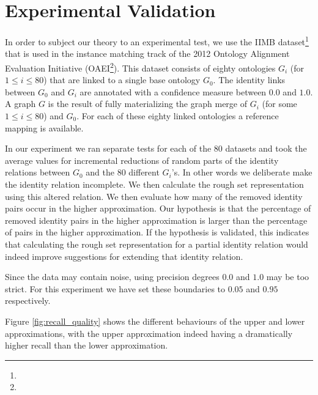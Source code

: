 \section{Experimental Validation}
\label{sec:experiment}
\label{sec:experimental_design}
\label{sec:experimental_validation}

In order to subject our theory to an experimental test,
  we use the IIMB dataset\footnote{}
  that is used in the
  instance matching track of the 2012 Ontology Alignment Evaluation
  Initiative (OAEI\footnote{}).
This dataset consists of eighty ontologies $G_i$ (for $1 \leq i \leq 80$)
  that are linked to a single base ontology $G_0$.
The identity links between $G_0$ and $G_i$ are annotated with a
  confidence measure between $0.0$ and $1.0$.
A graph $G$ is the result of fully materializing the graph merge
  of $G_i$ (for some $1 \leq i \leq 80$) and $G_0$.
For each of these eighty linked ontologies a reference mapping is available.

In our experiment we ran separate tests for each of the $80$ datasets
  and took the average values for incremental reductions of
  random parts of the identity relations between $G_0$ and the $80$
  different $G_i$'s.
In other words we deliberate make the identity relation incomplete.
We then calculate the rough set representation using this altered relation.
We then evaluate how many of the removed identity pairs occur in
  the higher approximation.
Our hypothesis is that the percentage of removed identity pairs
  in the higher approximation is larger than the percentage of pairs
  in the higher approximation.
If the hypothesis is validated, this indicates that
  calculating the rough set representation for a partial identity relation
  would indeed improve suggestions for extending that identity relation.

Since the data may contain noise, using precision degrees $0.0$ and $1.0$
  may be too strict. For this experiment we have set these boundaries
  to $0.05$ and $0.95$ respectively.

Figure \ref{fig:recall_quality} shows the different behaviours of the
  upper and lower approximations, with the upper approximation indeed
  having a dramatically higher recall than the lower approximation.

